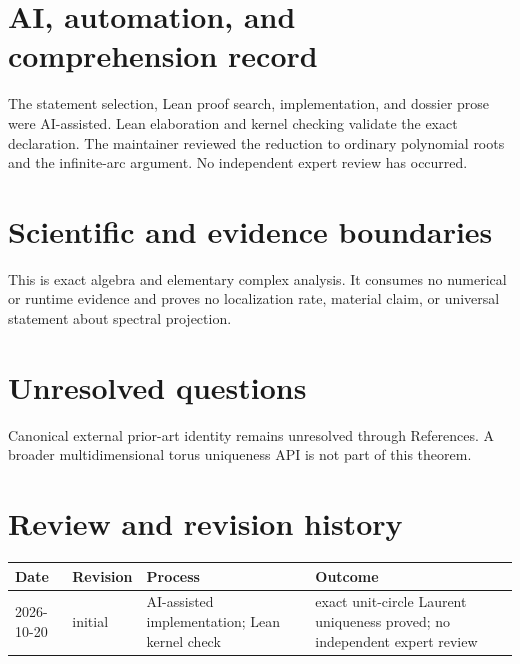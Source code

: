 \documentclass[11pt]{article}
\begin{document}
\section{AI, automation, and comprehension record}
The statement selection, Lean proof search, implementation, and dossier prose were
AI-assisted. Lean elaboration and kernel checking validate the exact declaration. The
maintainer reviewed the reduction to ordinary polynomial roots and the infinite-arc
argument. No independent expert review has occurred.

\section{Scientific and evidence boundaries}
This is exact algebra and elementary complex analysis. It consumes no numerical or
runtime evidence and proves no localization rate, material claim, or universal statement
about spectral projection.

\section{Unresolved questions}
Canonical external prior-art identity remains unresolved through References. A broader
multidimensional torus uniqueness API is not part of this theorem.

\section{Review and revision history}
\begin{tabularx}{\textwidth}{@{}lllX@{}}\toprule
Date & Revision & Process & Outcome \\
\midrule
2026-10-20 & initial & AI-assisted implementation; Lean kernel check & exact unit-circle Laurent uniqueness proved; no independent expert review \\
\bottomrule\end{tabularx}
\end{document}
